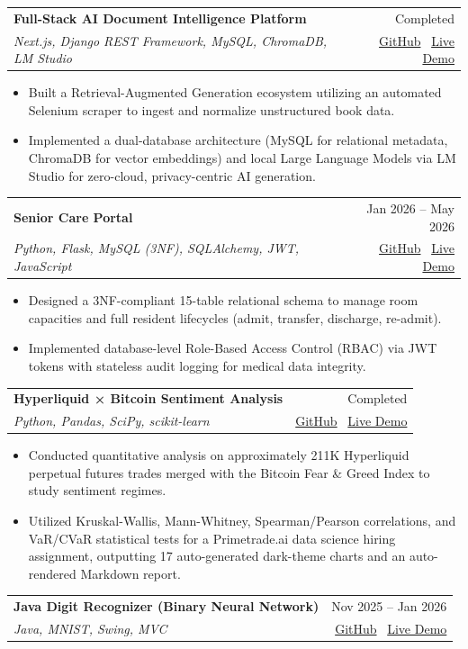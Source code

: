\documentclass[11pt,letterpaper]{article}
\newcommand{\resumeProjectHeading}[4]{
\vspace{2pt}
\begin{tabularx}{\textwidth}{X r}
\textbf{#1} & #2 \\
\textit{#3} & #4
\end{tabularx}
\vspace{-3pt}
}
\newcommand{\resumeItem}[1]{
\item #1
}
\newcommand{\resumeItemListStart}{
\begin{itemize}[leftmargin=0.22in,itemsep=1pt,topsep=2pt]
}
\newcommand{\resumeItemListEnd}{
\end{itemize}
}
\begin{document}
\vspace{4pt}

\resumeProjectHeading
{Full-Stack AI Document Intelligence Platform}
{Completed}
{Next.js, Django REST Framework, MySQL, ChromaDB, LM Studio}
{\href{https://github.com/your-github-link}{GitHub} \textbar\ \href{https://your-live-demo-link.com}{Live Demo}}

\resumeItemListStart
\resumeItem{Built a Retrieval-Augmented Generation ecosystem utilizing an automated Selenium scraper to ingest and normalize unstructured book data.}
\resumeItem{Implemented a dual-database architecture (MySQL for relational metadata, ChromaDB for vector embeddings) and local Large Language Models via LM Studio for zero-cloud, privacy-centric AI generation.}
\resumeItemListEnd

\vspace{4pt}

\resumeProjectHeading
{Senior Care Portal}
{Jan 2026 -- May 2026}
{Python, Flask, MySQL (3NF), SQLAlchemy, JWT, JavaScript}
{\href{https://github.com/your-github-link}{GitHub} \textbar\ \href{https://your-live-demo-link.com}{Live Demo}}

\resumeItemListStart
\resumeItem{Designed a 3NF-compliant 15-table relational schema to manage room capacities and full resident lifecycles (admit, transfer, discharge, re-admit).}
\resumeItem{Implemented database-level Role-Based Access Control (RBAC) via JWT tokens with stateless audit logging for medical data integrity.}
\resumeItemListEnd

\vspace{4pt}

\resumeProjectHeading
{Hyperliquid × Bitcoin Sentiment Analysis}
{Completed}
{Python, Pandas, SciPy, scikit-learn}
{\href{https://github.com/your-github-link}{GitHub} \textbar\ \href{https://your-live-demo-link.com}{Live Demo}}

\resumeItemListStart
\resumeItem{Conducted quantitative analysis on approximately 211K Hyperliquid perpetual futures trades merged with the Bitcoin Fear \& Greed Index to study sentiment regimes.}
\resumeItem{Utilized Kruskal-Wallis, Mann-Whitney, Spearman/Pearson correlations, and VaR/CVaR statistical tests for a Primetrade.ai data science hiring assignment, outputting 17 auto-generated dark-theme charts and an auto-rendered Markdown report.}
\resumeItemListEnd

\vspace{4pt}

\resumeProjectHeading
{Java Digit Recognizer (Binary Neural Network)}
{Nov 2025 -- Jan 2026}
{Java, MNIST, Swing, MVC}
{\href{https://github.com/your-github-link}{GitHub} \textbar\ \href{https://your-live-demo-link.com}{Live Demo}}
\end{document}
